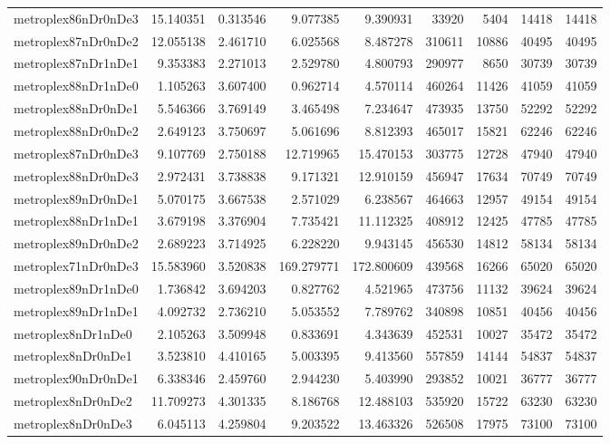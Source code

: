 \begin{longtable}{|l|r|r|r|r|r|r|r|r|}
metroplex86nDr0nDe3 & 15.140351 & 0.313546 & 9.077385 & 9.390931 & 33920 & 5404 & 14418 & 14418 \\
metroplex87nDr0nDe2 & 12.055138 & 2.461710 & 6.025568 & 8.487278 & 310611 & 10886 & 40495 & 40495 \\
metroplex87nDr1nDe1 & 9.353383 & 2.271013 & 2.529780 & 4.800793 & 290977 & 8650 & 30739 & 30739 \\
metroplex88nDr1nDe0 & 1.105263 & 3.607400 & 0.962714 & 4.570114 & 460264 & 11426 & 41059 & 41059 \\
metroplex88nDr0nDe1 & 5.546366 & 3.769149 & 3.465498 & 7.234647 & 473935 & 13750 & 52292 & 52292 \\
metroplex88nDr0nDe2 & 2.649123 & 3.750697 & 5.061696 & 8.812393 & 465017 & 15821 & 62246 & 62246 \\
metroplex87nDr0nDe3 & 9.107769 & 2.750188 & 12.719965 & 15.470153 & 303775 & 12728 & 47940 & 47940 \\
metroplex88nDr0nDe3 & 2.972431 & 3.738838 & 9.171321 & 12.910159 & 456947 & 17634 & 70749 & 70749 \\
metroplex89nDr0nDe1 & 5.070175 & 3.667538 & 2.571029 & 6.238567 & 464663 & 12957 & 49154 & 49154 \\
metroplex88nDr1nDe1 & 3.679198 & 3.376904 & 7.735421 & 11.112325 & 408912 & 12425 & 47785 & 47785 \\
metroplex89nDr0nDe2 & 2.689223 & 3.714925 & 6.228220 & 9.943145 & 456530 & 14812 & 58134 & 58134 \\
metroplex71nDr0nDe3 & 15.583960 & 3.520838 & 169.279771 & 172.800609 & 439568 & 16266 & 65020 & 65020 \\
metroplex89nDr1nDe0 & 1.736842 & 3.694203 & 0.827762 & 4.521965 & 473756 & 11132 & 39624 & 39624 \\
metroplex89nDr1nDe1 & 4.092732 & 2.736210 & 5.053552 & 7.789762 & 340898 & 10851 & 40456 & 40456 \\
metroplex8nDr1nDe0 & 2.105263 & 3.509948 & 0.833691 & 4.343639 & 452531 & 10027 & 35472 & 35472 \\
metroplex8nDr0nDe1 & 3.523810 & 4.410165 & 5.003395 & 9.413560 & 557859 & 14144 & 54837 & 54837 \\
metroplex90nDr0nDe1 & 6.338346 & 2.459760 & 2.944230 & 5.403990 & 293852 & 10021 & 36777 & 36777 \\
metroplex8nDr0nDe2 & 11.709273 & 4.301335 & 8.186768 & 12.488103 & 535920 & 15722 & 63230 & 63230 \\
metroplex8nDr0nDe3 & 6.045113 & 4.259804 & 9.203522 & 13.463326 & 526508 & 17975 & 73100 & 73100 \\

\end{longtable}
